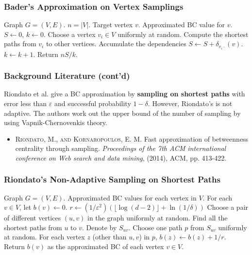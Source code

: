 \documentclass[12pt]{beamer}
\begin{document}
\begin{frame}
	\frametitle{Bader's Approximation on Vertex Samplings}
	\begin{algorithmic}
	\Require Graph $G=(V, E)$. $n=|V|$. Target vertex $v$.
	\Ensure Approximated BC value for $v$.
	\State $S\gets 0$, $k\gets 0$.
	\State Choose a vertex $v_i\in V$ uniformly at random.
	\State Compute the shortest paths from $v_i$ to other vertices. Accumulate the dependencies $S \gets S + \delta_{v_i\cdot}(v)$.
	\State $k\gets k+1$.
	\EndWhile
	\State Return $nS/k$.
	\end{algorithmic}
\end{frame}

\begin{frame}
	\frametitle{Background Literature (cont'd)}
	Riondato et al. give a BC approximation by {\bf sampling on shortest paths} with error less than $\varepsilon$ and successful probability $1-\delta$. 
	However, Riondato's is not adaptive. The authors work out the upper bound of the number of sampling by using Vapnik-Chernovenkis theory.
	
	\begin{itemize}
		\item \textsc{Riondato, M., and Kornaropoulos, E. M}. Fast approximation of betweenness centrality through sampling. {\it Proceedings of the 7th ACM international conference on Web search and data mining}, (2014), ACM, pp. 413-422.
	\end{itemize}
\end{frame}

\begin{frame}
	\frametitle{Riondato's Non-Adaptive Sampling on Shortest Paths}
	\begin{algorithmic}
	\Require Graph $G=(V, E)$.
	\Ensure Approximated BC values for each vertex in $V$.
	\State For each $v\in V$, let $b(v) \gets 0$.
	\State $r \gets (1/\varepsilon^2)(\lfloor\log (d-2)\rfloor+\ln(1/\delta))$
	\For {$i \gets 1$ to $r$}
		\State Choose a pair of different vertices $(u, v)$ in the graph uniformly at random.
		\State Find all the shortest paths from $u$ to $v$. Denote by $S_{uv}$.
		\State Choose one path $p$ from $S_{uv}$ uniformly at random.
		\State For each vertex $z$ (other than $u, v$) in $p$, $b(z) \gets b(z) + 1/r$.
	\EndFor
	\State Return $b(v)$ as the approximated BC of each vertex $v \in V$.
	\end{algorithmic}
\end{frame}
\end{document}
